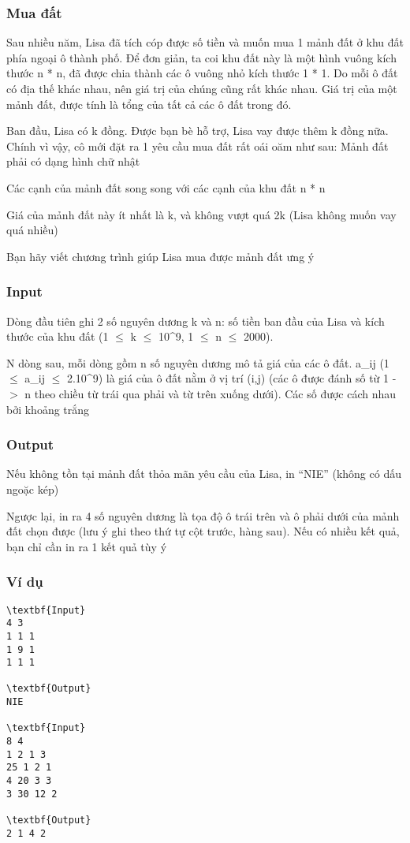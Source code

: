 



\subsubsection{   Mua đất  }

   Sau nhiều năm, Lisa đã tích cóp được số tiền và muốn mua 1 mảnh đất ở khu đất phía ngoại ô thành phố. Để đơn giản, ta coi khu đất này là một hình vuông kích thước n * n, đã được chia thành các ô vuông nhỏ kích thước 1 * 1. Do mỗi ô đất có địa thế khác nhau, nên giá trị của chúng cũng rất khác nhau. Giá trị của một mảnh đất, được tính là tổng của tất cả các ô đất trong đó.  

   Ban đầu, Lisa có k đồng. Được bạn bè hỗ trợ, Lisa vay được thêm k đồng nữa. Chính vì vậy, cô mới đặt ra 1 yêu cầu mua đất rất oái oăm như sau: Mảnh đất phải có dạng hình chữ nhật  

   Các cạnh của mảnh đất song song với các cạnh của khu đất n * n  

   Giá của mảnh đất này ít nhất là k, và không vượt quá 2k (Lisa không muốn vay quá nhiều)  

   Bạn hãy viết chương trình giúp Lisa mua được mảnh đất ưng ý  

\subsubsection{   Input  }

   Dòng đầu tiên ghi 2 số nguyên dương k và n: số tiền ban đầu của Lisa và kích thước của khu đất (1  $\le$  k  $\le$  10^9, 1  $\le$  n  $\le$  2000).  

   N dòng sau, mỗi dòng gồm n số nguyên dương mô tả giá của các ô đất. a\_ij (1  $\le$  a­\_ij  $\le$  2.10^9) là giá của ô đất nằm ở vị trí (i,j) (các ô được đánh số từ 1 -$>$ n theo chiều từ trái qua phải và từ trên xuống dưới). Các số được cách nhau bởi khoảng trắng  

\subsubsection{   Output  }

   Nếu không tồn tại mảnh đất thỏa mãn yêu cầu của Lisa, in “NIE” (không có dấu ngoặc kép)  

   Ngược lại, in ra 4 số nguyên dương là tọa độ ô trái trên và ô phải dưới của mảnh đất chọn được (lưu ý ghi theo thứ tự cột trước, hàng sau). Nếu có nhiều kết quả, bạn chỉ cần in ra 1 kết quả tùy ý  

\subsubsection{   Ví dụ  }
\begin{verbatim}
\textbf{Input}
4 3
1 1 1
1 9 1
1 1 1

\textbf{Output}
NIE

\textbf{Input}
8 4
1 2 1 3
25 1 2 1
4 20 3 3
3 30 12 2

\textbf{Output}
2 1 4 2
\end{verbatim}
